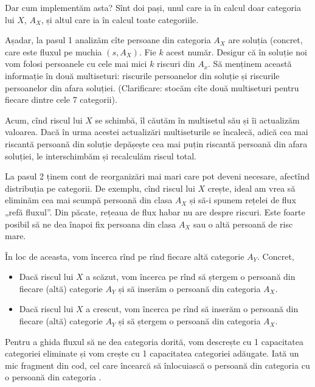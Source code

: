 \documentclass[../main.tex]{subfiles}
\begin{document}
Dar cum implementăm asta? Sînt doi pași, unul care ia în calcul doar categoria lui $X$, $A_X$, și altul care ia în calcul toate categoriile.

Așadar, la pasul 1 analizăm cîte persoane din categoria $A_X$ are soluția (concret, care este fluxul pe muchia $(s, A_X)$. Fie $k$ acest număr. Desigur că în soluție noi vom folosi persoanele cu cele mai mici $k$ riscuri din $A_x$. Să menținem această informație în două multiseturi: riscurile persoanelor din soluție și riscurile persoanelor din afara soluției. (Clarificare: stocăm cîte două multiseturi pentru fiecare dintre cele 7 categorii).

Acum, cînd riscul lui $X$ se schimbă, îl căutăm în multisetul său și îi actualizăm valoarea. Dacă în urma acestei actualizări multiseturile se încalecă, adică cea mai riscantă persoană din soluție depășește cea mai puțin riscantă persoană din afara soluției, le interschimbăm și recalculăm riscul total.

La pasul 2 ținem cont de reorganizări mai mari care pot deveni necesare, afectînd distribuția pe categorii. De exemplu, cînd riscul lui $X$ crește, ideal am vrea să eliminăm cea mai scumpă persoană din clasa $A_X$ și să-i spunem rețelei de flux „refă fluxul”. Din păcate, rețeaua de flux habar nu are despre riscuri. Este foarte posibil să ne dea înapoi fix persoana din clasa $A_X$ sau o altă persoană de risc mare.

În loc de aceasta, vom încerca rînd pe rînd fiecare altă categorie $A_Y$. Concret,

\begin{itemize}
  \item Dacă riscul lui $X$ a scăzut, vom încerca pe rînd să ștergem o persoană din fiecare (altă) categorie $A_Y$ și să inserăm o persoană din categoria $A_X$.
  \item Dacă riscul lui $X$ a crescut, vom încerca pe rînd să inserăm o persoană din fiecare (altă) categorie $A_Y$ și să ștergem o persoană din categoria $A_X$.
\end{itemize}

Pentru a ghida fluxul să ne dea categoria dorită, vom descrește cu 1 capacitatea categoriei eliminate și vom crește cu 1 capacitatea categoriei adăugate. Iată un mic fragment din cod, cel care încearcă să înlocuiască o persoană din categoria  cu o persoană din categoria .
\end{document}

